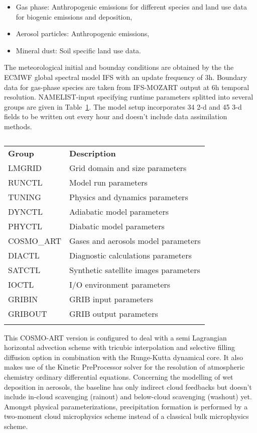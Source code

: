 \begin{itemize}
\item  Gas phase:  Anthropogenic emissions  for different  species and
  land use data for biogenic emissions and deposition,
\item Aerosol particles: Anthropogenic emissions,
\item Mineral dust: Soil specific land use data.
\end{itemize}

The meteorological initial and  bounday conditions are obtained by the
the ECMWF  global spectral model IFS  with an update  frequency of 3h.
Boundary data  for gas-phase species are taken  from IFS-MOZART output
at   6h  temporal   resolution.   NAMELIST-input   specifying  runtime
parameters    splitted   into    several   groups    are    given   in
Table~\ref{tab:1}.  The model  setup incorporates  34 2-d  and  45 3-d
fields  to  be  written  out  every  hour  and  doesn't  include  data
assimilation methods.

\begin{table}[htbf]
  \begin{center}
    \caption{}
    \label{tab:1}
    \begin{tabular}{ll}
      \hline\noalign{\smallskip} 
      \textbf{Group} & \textbf{Description} \\
      \noalign{\smallskip}\hline\noalign{\smallskip}
      LMGRID & Grid domain and size parameters \\
      RUNCTL & Model run parameters \\
      TUNING & Physics and dynamics parameters \\
      DYNCTL & Adiabatic model parameters \\
      PHYCTL & Diabatic model parameters \\
      COSMO\_ART & Gases and aerosols model parameters \\
      DIACTL & Diagnostic calculations parameters \\
      SATCTL & Synthetic satellite images parameters \\
      IOCTL & I/O environment parameters \\
      GRIBIN & GRIB input parameters \\
      GRIBOUT & GRIB output parameters \\
     \noalign{\smallskip}\hline
    \end{tabular}
  \end{center}
\end{table}

This COSMO-ART  version is configured  to deal with a  semi Lagrangian
horizontal advection scheme  with tricubic interpolation and selective
filling diffusion option in combination with the Runge-Kutta dynamical
core. It  also makes  use of the  Kinetic PreProcessor solver  for the
resolution of  atmospheric chemistry ordinary  differential equations.
Concerning the  modelling of wet deposition in  aerosols, the baseline
has  only  indirect  cloud  feedbacks  but  doesn't  include  in-cloud
scavenging  (rainout)   and  below-cloud  scavenging   (washout)  yet.
Amongst   physical  parameterizations,   precipitation   formation  is
performed  by a  two-moment  cloud microphysics  scheme  instead of  a
classical  bulk microphysics  scheme.
